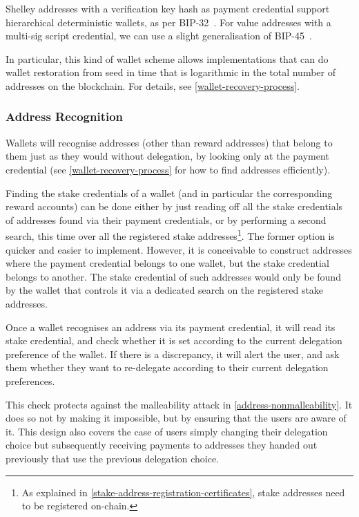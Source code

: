 \documentclass[11pt,a4paper,dvipsnames,twosided]{article}
\newcommand{\citep}[1]{\cite{#1}}
\begin{document}
Shelley addresses with a verification key hash as payment credential
support hierarchical deterministic wallets, as per BIP-32~\citep{bip32}.
%
For value addresses with a multi-sig script credential, we can use a slight
generalisation of BIP-45~\citep{bip45}.

In particular, this kind of wallet scheme allows implementations that can
do wallet restoration from seed in time that is logarithmic in
the total number of addresses on the blockchain. For details, see
\cref{wallet-recovery-process}.

\subsubsection{Address Recognition}
\label{address-recognition-1}

Wallets will recognise addresses (other than reward addresses) that belong to
them just as they would without delegation, by looking only at the
payment credential (see \cref{wallet-recovery-process} for how to find
addresses efficiently).

Finding the stake credentials of a wallet (and in particular the corresponding
reward accounts) can be done either by just reading off all the stake credentials
of addresses found via their payment credentials, or by performing a second search,
this time over all the registered stake addresses\footnote{As explained in
  \cref{stake-address-registration-certificates}, stake addresses need to be
  registered on-chain.}. The former option is quicker and easier to implement.
However, it is conceivable to construct addresses where the payment credential
belongs to one wallet, but the stake credential belongs to another. The stake
credential of such addresses would only be found by the wallet that controls it via
a dedicated search on the registered stake addresses.

Once a wallet recognises an address via its payment credential, it will read its
stake credential, and check whether it is set according
to the current delegation preference of the wallet. If there is a
discrepancy, it will alert the user, and ask them whether they want to
re-delegate according to their current delegation preferences.

This check protects against the malleability attack in
\cref{address-nonmalleability}. It does so not by making it impossible, but
by ensuring that the users are aware of it. This design also covers the case
of users simply changing their delegation choice but subsequently receiving
payments to addresses they handed out previously that use the previous
delegation choice.
\end{document}
